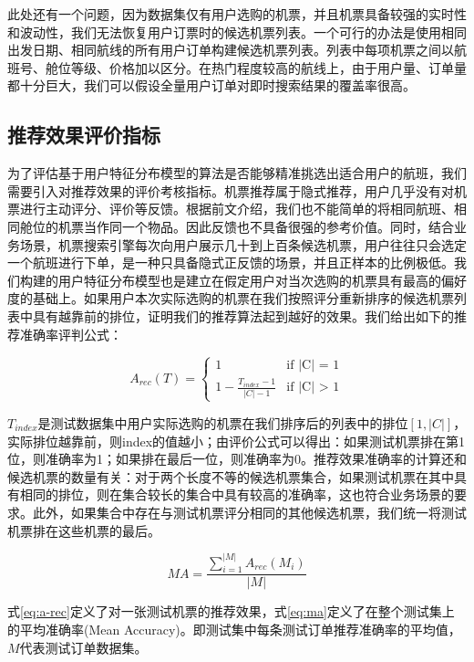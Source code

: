 此处还有一个问题，因为数据集仅有用户选购的机票，并且机票具备较强的实时性和波动性，我们无法恢复用户订票时的候选机票列表。一个可行的办法是使用相同出发日期、相同航线的所有用户订单构建候选机票列表。列表中每项机票之间以航班号、舱位等级、价格加以区分。在热门程度较高的航线上，由于用户量、订单量都十分巨大，我们可以假设全量用户订单对即时搜索结果的覆盖率很高。


\subsection{推荐效果评价指标}
为了评估基于用户特征分布模型的算法是否能够精准挑选出适合用户的航班，我们需要引入对推荐效果的评价考核指标。机票推荐属于隐式推荐，用户几乎没有对机票进行主动评分、评价等反馈。根据前文介绍，我们也不能简单的将相同航班、相同舱位的机票当作同一个物品。因此反馈也不具备很强的参考价值。同时，结合业务场景，机票搜索引擎每次向用户展示几十到上百条候选机票，用户往往只会选定一个航班进行下单，是一种只具备隐式正反馈的场景，并且正样本的比例极低。我们构建的用户特征分布模型也是建立在假定用户对当次选购的机票具有最高的偏好度的基础上。如果用户本次实际选购的机票在我们按照评分重新排序的候选机票列表中具有越靠前的排位，证明我们的推荐算法起到越好的效果。我们给出如下的推荐准确率评判公式：

\begin{equation}
\label{eq:a-rec}
A_{rec}(T) =
\begin{cases}
1 & \mbox{if |C| = 1}\\
1 - \frac{T_{index}-1}{|C|-1} & \mbox{if |C| > 1}
\end{cases}
\end{equation}

$T_{index}$是测试数据集中用户实际选购的机票在我们排序后的列表中的排位$[1,|C|]$，实际排位越靠前，则index的值越小；由评价公式可以得出：如果测试机票排在第1位，则准确率为1；如果排在最后一位，则准确率为0。推荐效果准确率的计算还和候选机票的数量有关：对于两个长度不等的候选机票集合，如果测试机票在其中具有相同的排位，则在集合较长的集合中具有较高的准确率，这也符合业务场景的要求。此外，如果集合中存在与测试机票评分相同的其他候选机票，我们统一将测试机票排在这些机票的最后。

\begin{equation}
\label{eq:ma}
MA = \frac{\sum_{i=1}^{|M|}A_{rec}(M_i)}{|M|}
\end{equation}

式\ref{eq:a-rec}定义了对一张测试机票的推荐效果，式\ref{eq:ma}定义了在整个测试集上的平均准确率(Mean Accuracy)。即测试集中每条测试订单推荐准确率的平均值，$M$代表测试订单数据集。

